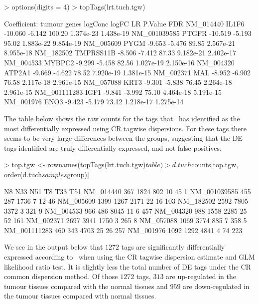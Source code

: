 \begin{Schunk}
\begin{Sinput}
> options(digits = 4)
> topTags(lrt.tuch.tgw)
\end{Sinput}
\begin{Soutput}
Coefficient:  tumour 
                 genes logConc  logFC     LR   P.Value       FDR
NM_014440        IL1F6 -10.060 -6.142 100.20 1.374e-23 1.438e-19
NM_001039585     PTGFR -10.519 -5.193  95.02 1.883e-22 9.854e-19
NM_005609         PYGM  -9.653 -5.476  89.85 2.567e-21 8.955e-18
NM_182502    TMPRSS11B  -8.506 -7.412  87.33 9.182e-21 2.402e-17
NM_004533       MYBPC2  -9.299 -5.458  82.56 1.027e-19 2.150e-16
NM_004320       ATP2A1  -9.669 -4.622  78.52 7.920e-19 1.381e-15
NM_002371          MAL  -8.952 -6.902  76.58 2.117e-18 2.961e-15
NM_057088         KRT3  -9.301 -5.838  76.45 2.264e-18 2.961e-15
NM_001111283      IGF1  -9.841 -3.992  75.10 4.464e-18 5.191e-15
NM_001976         ENO3  -9.423 -5.179  73.12 1.218e-17 1.275e-14
\end{Soutput}
\end{Schunk}

The table below shows the raw counts for the tags that \edgeR~has
identified as the most differentially expressed using CR tagwise
dispersions. For these tags there seems to be very large differences
between the groups, suggesting that the DE tags identified are truly
differentially expressed, and not false positives.

\begin{Schunk}
\begin{Sinput}
> top.tgw <- rownames(topTags(lrt.tuch.tgw)$table)
> d.tuch$counts[top.tgw, order(d.tuch$samples$group)]
\end{Sinput}
\begin{Soutput}
               N8  N33  N51 T8 T33 T51
NM_014440     367 1824  802 10  45   1
NM_001039585  455  287 1736  7  12  46
NM_005609    1399 1267 2171 22  16 103
NM_182502    2592 7805 3372  3 321   9
NM_004533     966  486 8045 11   6 457
NM_004320     988 1558 2285 25  52 161
NM_002371    2697 3941 1750  3 265   8
NM_057088    1069 3774  885  7 358   5
NM_001111283  460  343 4703 25  26 257
NM_001976    1092 1292 4841  4  74 223
\end{Soutput}
\end{Schunk}

We see in the output below that $1272$ tags are significantly
differentially expressed according to \edgeR~when using the CR tagwise
dispersion estimate and GLM likelihood ratio test. It is slightly less
the total number of DE tags under the CR common dispersion method. Of
those $1272$ tags, $313$ are up-regulated in the tumour tissues
compared with the normal tissues and $959$ are down-regulated in the
tumour tissues compared with normal tissues.

